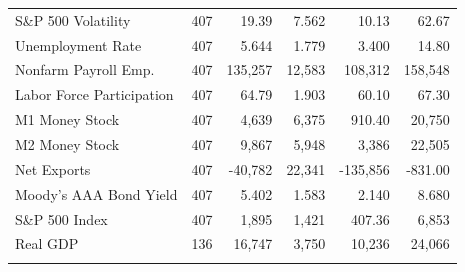 \begin{longtable}{lrrrrr}
S\&P 500 Volatility & 407 & 19.39 & 7.562 & 10.13 & 62.67 \\
Unemployment Rate & 407 & 5.644 & 1.779 & 3.400 & 14.80 \\
Nonfarm Payroll Emp. & 407 & 135,257 & 12,583 & 108,312 & 158,548 \\
Labor Force Participation & 407 & 64.79 & 1.903 & 60.10 & 67.30 \\
M1 Money Stock & 407 & 4,639 & 6,375 & 910.40 & 20,750 \\
M2 Money Stock & 407 & 9,867 & 5,948 & 3,386 & 22,505 \\
Net Exports & 407 & -40,782 & 22,341 & -135,856 & -831.00 \\
Moody's AAA Bond Yield & 407 & 5.402 & 1.583 & 2.140 & 8.680 \\
S\&P 500 Index & 407 & 1,895 & 1,421 & 407.36 & 6,853 \\
Real GDP & 136 & 16,747 & 3,750 & 10,236 & 24,066 \\
\addlinespace
\end{longtable}
